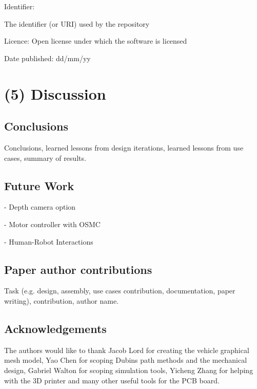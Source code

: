 \documentclass[a4paper]{article}
\begin{document}
Identifier: {The identifier (or URI) used by the repository

Licence: Open license under which the software is licensed

Date published: dd/mm/yy


\section{(5) Discussion}\label{h.90jl7wm65t65}

\subsection{Conclusions}\label{h.h3fr33ylzsnh}

Conclusions, learned lessons from design iterations, learned lessons
from use cases, summary of results.


\subsection{Future Work}\label{h.neocsr410zj}


- Depth camera option

- Motor controller with OSMC

- Human-Robot Interactions


\subsection{Paper author contributions}\label{h.fy8hbipy6kwe}

Task (e.g. design, assembly, use cases contribution, documentation,
paper writing), contribution, author name.


\subsection{Acknowledgements}\label{h.gu3yyarx72d6}

	The authors would like to thank Jacob Lord for creating the vehicle graphical mesh model, Yao Chen for scoping Dubins path methods and the mechanical design, Gabriel Walton for scoping simulation tools, Yicheng Zhang for helping with the 3D printer and many other useful tools for the PCB board.


}
\end{document}
